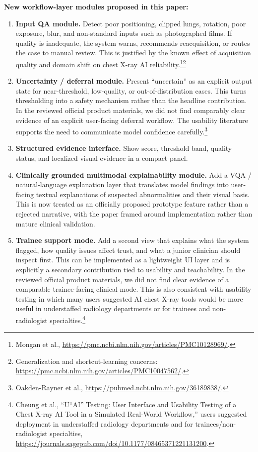 \documentclass[11pt]{article}
\begin{document}
\textbf{New workflow-layer modules proposed in this paper:}
\begin{enumerate}[leftmargin=1.8em]
    \item \textbf{Input QA module.} Detect poor positioning, clipped lungs, rotation, poor exposure, blur, and non-standard inputs such as photographed films. If quality is inadequate, the system warns, recommends reacquisition, or routes the case to manual review. This is justified by the known effect of acquisition quality and domain shift on chest X-ray AI reliability.\footnote{Mongan et al., \url{https://pmc.ncbi.nlm.nih.gov/articles/PMC10128969/}.}\footnote{Generalization and shortcut-learning concerns: \url{https://pmc.ncbi.nlm.nih.gov/articles/PMC10047562/}.}
    \item \textbf{Uncertainty / deferral module.} Present ``uncertain'' as an explicit output state for near-threshold, low-quality, or out-of-distribution cases. This turns thresholding into a safety mechanism rather than the headline contribution. In the reviewed official product materials, we did not find comparably clear evidence of an explicit user-facing deferral workflow. The usability literature supports the need to communicate model confidence carefully.\footnote{Oakden-Rayner et al., \url{https://pubmed.ncbi.nlm.nih.gov/36189838/}.}
    \item \textbf{Structured evidence interface.} Show score, threshold band, quality status, and localized visual evidence in a compact panel.
    \item \textbf{Clinically grounded multimodal explainability module.} Add a VQA / natural-language explanation layer that translates model findings into user-facing textual explanations of suspected abnormalities and their visual basis. This is now treated as an officially proposed prototype feature rather than a rejected narrative, with the paper framed around implementation rather than mature clinical validation.
    \item \textbf{Trainee support mode.} Add a second view that explains what the system flagged, how quality issues affect trust, and what a junior clinician should inspect first. This can be implemented as a lightweight UI layer and is explicitly a secondary contribution tied to usability and teachability. In the reviewed official product materials, we did not find clear evidence of a comparable trainee-facing clinical mode. This is also consistent with usability testing in which many users suggested AI chest X-ray tools would be more useful in understaffed radiology departments or for trainees and non-radiologist specialties.\footnote{Cheung et al., ``U``AI'' Testing: User Interface and Usability Testing of a Chest X-ray AI Tool in a Simulated Real-World Workflow,'' users suggested deployment in understaffed radiology departments and for trainees/non-radiologist specialties, \url{https://journals.sagepub.com/doi/10.1177/08465371221131200}.}

\end{enumerate}
\end{document}
